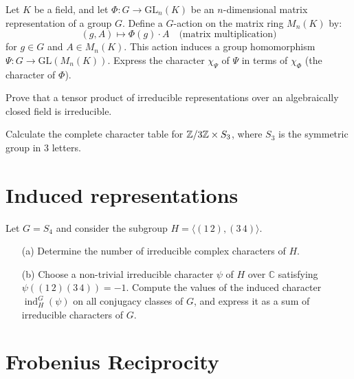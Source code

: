 \begin{prob}[S2011-Q5]
    Let \( K \) be a field, and let \( \Phi \colon G \to \mathrm{GL}_n(K) \) be an \( n \)-dimensional matrix representation of a group \( G \). Define a \( G \)-action on the matrix ring \( M_n(K) \) by:
\[
(g, A) \mapsto \Phi(g) \cdot A \quad \text{(matrix multiplication)}
\]
for \( g \in G \) and \( A \in M_n(K) \). This action induces a group homomorphism \( \Psi \colon G \to \mathrm{GL}(M_n(K)) \). Express the character \( \chi_\Psi \) of \( \Psi \) in terms of \( \chi_\Phi \) (the character of \( \Phi \)).
\end{prob}

\begin{prob}[S2015-Q5]
    Prove that a tensor product of irreducible representations over an algebraically closed field is irreducible.
\end{prob}

\begin{prob}[S2001-Q3]
    Calculate the complete character table for $\mathbb{Z}/3\mathbb{Z}\times S_3$, where $S_3$ is the symmetric group in 3 letters.
\end{prob}

\section{Induced representations}


\begin{prob}[S2009-Q6]
    Let \( G = S_4 \) and consider the subgroup \( H = \langle (1\,2), (3\,4) \rangle \).
    
    \begin{enumerate}
        \item[(a)] Determine the number of irreducible complex characters of \( H \).
        
        \item[(b)] Choose a non-trivial irreducible character \( \psi \) of \( H \) over \( \mathbb{C} \) satisfying \( \psi((1\,2)(3\,4)) = -1 \). Compute the values of the induced character \( \operatorname{ind}_H^G(\psi) \) on all conjugacy classes of \( G \), and express it as a sum of irreducible characters of \( G \).
    \end{enumerate}
\end{prob}

\section{Frobenius Reciprocity}

